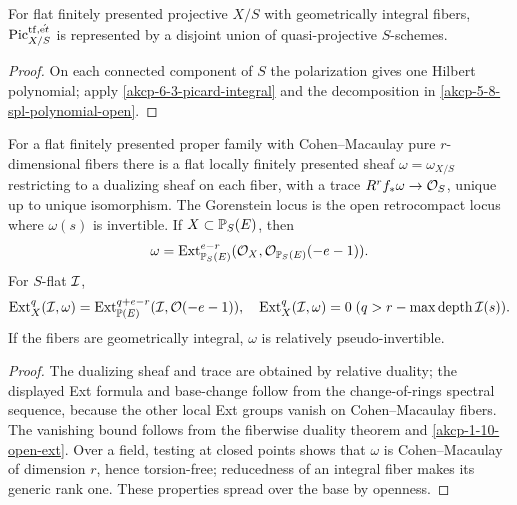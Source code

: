 \begin{corollary}
\label{akcp-6-4-picard-locally-projective}
For flat finitely presented projective $X/S$ with geometrically integral fibers,
$\operatorname{Pic}^{\mathrm{tf},\acute{\mathrm et}}_{X/S}$ is represented by a disjoint union
of quasi-projective $S$-schemes.
\end{corollary}
\begin{proof}
On each connected component of $S$ the polarization gives one Hilbert
polynomial; apply \cref{akcp-6-3-picard-integral} and the decomposition in
\cref{akcp-5-8-spl-polynomial-open}.
\end{proof}

\begin{definition}
\label{akcp-6-5-dualizing}
For a flat finitely presented proper family with Cohen--Macaulay pure
$r$-dimensional fibers there is a flat locally finitely presented sheaf
$\omega=\omega_{X/S}$ restricting to a dualizing sheaf on each fiber, with a
trace $R^rf_*\omega\to\mathcal O_S$, unique up to unique isomorphism.  The Gorenstein
locus is the open retrocompact locus where $\omega(s)$ is invertible.  If
$X\subset\mathbb P_S(E)$, then
\[
\omega=\operatorname{Ext}^{e-r}_{\mathbb P_S(E)}(\mathcal O_X,\mathcal O_{\mathbb P_S(E)}(-e-1)).
\]
For $S$-flat $\mathcal I$,
\[
\operatorname{Ext}_X^q(\mathcal I,\omega)=
\operatorname{Ext}_{\mathbb P(E)}^{q+e-r}(\mathcal I,\mathcal O(-e-1)),
\quad
\operatorname{Ext}_X^q(\mathcal I,\omega)=0\; (q>r-\max\operatorname{depth}\mathcal I(s)).
\]
If the fibers are geometrically integral, $\omega$ is relatively
pseudo-invertible.
\end{definition}
\begin{proof}
The dualizing sheaf and trace are obtained by relative duality; the displayed
Ext formula and base-change follow from the change-of-rings spectral sequence,
because the other local Ext groups vanish on Cohen--Macaulay fibers.  The
vanishing bound follows from the fiberwise duality theorem and
\cref{akcp-1-10-open-ext}.  Over a field, testing at closed points shows that
$\omega$ is Cohen--Macaulay of dimension $r$, hence torsion-free; reducedness
of an integral fiber makes its generic rank one.  These properties spread over
the base by openness.
\end{proof}

